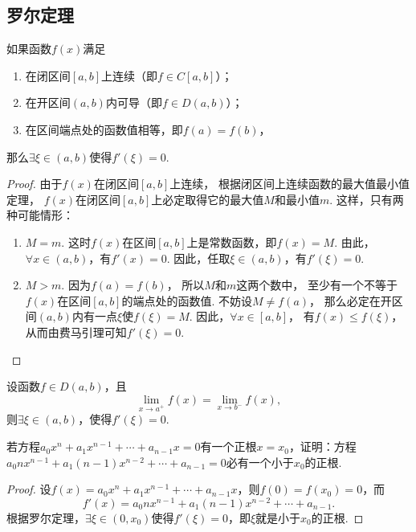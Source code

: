 \subsection{罗尔定理}
\begin{theorem}[罗尔定理]\label{theorem:微分中值定理.罗尔定理}
如果函数\(f(x)\)满足
\begin{enumerate}
	\item 在闭区间\([a,b]\)上连续（即\(f \in C[a,b]\)）；
	\item 在开区间\((a,b)\)内可导（即\(f \in D(a,b)\)）；
	\item 在区间端点处的函数值相等，即\(f(a)=f(b)\)，
\end{enumerate}
那么\(\exists \xi \in (a,b)\)使得\(f'(\xi) = 0\).
\begin{proof}
由于\(f(x)\)在闭区间\([a,b]\)上连续，
根据闭区间上连续函数的最大值最小值定理，
\(f(x)\)在闭区间\([a,b]\)上必定取得它的最大值\(M\)和最小值\(m\).
这样，只有两种可能情形：
\begin{enumerate}
	\item \(M=m\).
		这时\(f(x)\)在区间\([a,b]\)上是常数函数，即\(f(x)=M\).
		由此，\(\forall x\in(a,b)\)，有\(f'(x)=0\).
		因此，任取\(\xi\in(a,b)\)，有\(f'(\xi)=0\).

	\item \(M>m\).
		因为\(f(a)=f(b)\)，
		所以\(M\)和\(m\)这两个数中，
		至少有一个不等于\(f(x)\)在区间\([a,b]\)的端点处的函数值.
		不妨设\(M \neq f(a)\)，
		那么必定在开区间\((a,b)\)内有一点\(\xi\)使\(f(\xi)=M\).
		因此，\(\forall x\in[a,b]\)，
		有\(f(x) \leq f(\xi)\)，从而由费马引理可知\(f'(\xi)=0\).
		\qedhere
\end{enumerate}
\end{proof}
\end{theorem}

\begin{corollary}
设函数\(f \in D(a,b)\)，且\[
\lim\limits_{x \to a^+} f(x)
= \lim\limits_{x \to b^-} f(x),
\]则\(\exists\xi\in(a,b)\)，使得\(f'(\xi) = 0\).
\end{corollary}

\begin{example}
若方程\(a_0 x^n + a_1 x^{n-1} + \dotsb + a_{n-1} x = 0\)有一个正根\(x = x_0\)，证明：方程\(a_0 n x^{n-1} + a_1 (n-1) x^{n-2} + \dotsb + a_{n-1} = 0\)必有一个小于\(x_0\)的正根.
\begin{proof}
设\(f(x) = a_0 x^n + a_1 x^{n-1} + \dotsb + a_{n-1} x\)，则\(f(0) = f(x_0) = 0\)，而\[
f'(x) = a_0 n x^{n-1} + a_1 (n-1) x^{n-2} + \dotsb + a_{n-1}.
\]根据罗尔定理，\(\exists \xi \in (0,x_0)\)使得\(f'(\xi) = 0\)，即\(\xi\)就是小于\(x_0\)的正根.
\end{proof}
\end{example}

